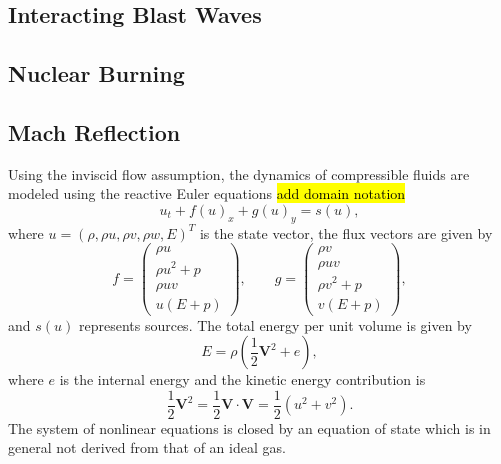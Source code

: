 \documentclass[]{article}
\begin{document}
    \subsection*{Interacting Blast Waves}

    \subsection*{Nuclear Burning}

    \subsection*{Mach Reflection}

        Using the inviscid flow assumption, the dynamics of compressible fluids are
        modeled using the reactive Euler equations \hl{add domain notation}
        \begin{equation}
           u_{t} + f(u)_{x}
           + g(u)_{y} = s(u),
            \label{goveq}
        \end{equation}
        where $u = \left( \rho, \rho u, \rho v, \rho w, E \right)^{T}$ is
        the state vector, the flux vectors are given by
        \begin{equation}
            f = 
        \begin{pmatrix}
        \rho u \\ \rho u^2 + p \\ \rho u v \\ u( E + p )
        \end{pmatrix}, \text{ } \text{ } \text{ }
            g = 
        \begin{pmatrix}
        \rho v \\ \rho u v \\ \rho v^2 + p \\ v( E + p )
        \end{pmatrix},
        \end{equation}
        and $s(u)$ represents sources. The total energy per
        unit volume is given by
        \begin{equation*}
            E = \rho \left( \frac{1}{2} \mathbf{V}^{2} + e \right),
        \end{equation*}
        where $e$ is the internal energy and the kinetic energy contribution is
        \begin{equation*}
            \frac{1}{2} \mathbf{V}^{2} = \frac{1}{2} \mathbf{V}
            \cdot \mathbf{V} = \frac{1}{2} \left( u^2 + v^2 \right).
        \end{equation*}
        The system of nonlinear equations is closed by an
        equation of state which is in general not derived from that of an ideal gas.
\end{document}
